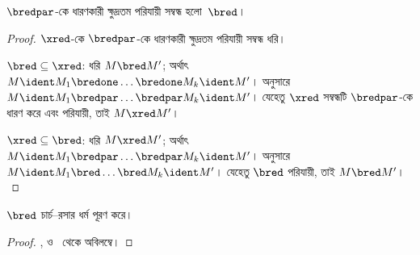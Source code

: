 \documentclass[../../../include/open-logic-section]{subfiles}
\begin{document}
\begin{lem}
  $\bredpar$-কে ধারণকারী ক্ষুদ্রতম পরিযায়ী সম্বন্ধ হলো~$\bred$।
\end{lem}

\begin{proof}
  $\xred$-কে $\bredpar$-কে ধারণকারী ক্ষুদ্রতম পরিযায়ী সম্বন্ধ ধরি।

  $\bred \subseteq \xred$: ধরি $M \bred M'$; অর্থাৎ $M \ident M_1
  \bredone \dots \bredone M_k \ident M'$।  অনুসারে
  $M \ident M_1 \bredpar \dots \bredpar M_k \ident M'$। যেহেতু
  $\xred$ সম্বন্ধটি $\bredpar$-কে ধারণ করে এবং পরিযায়ী, তাই
  $M \xred M'$।

  $\xred \subseteq \bred$: ধরি $M \xred M'$; অর্থাৎ $M
  \ident M_1 \bredpar \dots \bredpar M_k \ident M'$।
   অনুসারে $M \ident M_1
  \bred \dots \bred M_k \ident M'$। যেহেতু $\bred$ পরিযায়ী, তাই
  $M \bred M'$।
\end{proof}

\begin{thm}
  $\bred$ চার্চ--রসার ধর্ম পূরণ করে।
\end{thm}

\begin{proof}
  ,  ও~ থেকে
  অবিলম্বে।
\end{proof}
\end{document}
